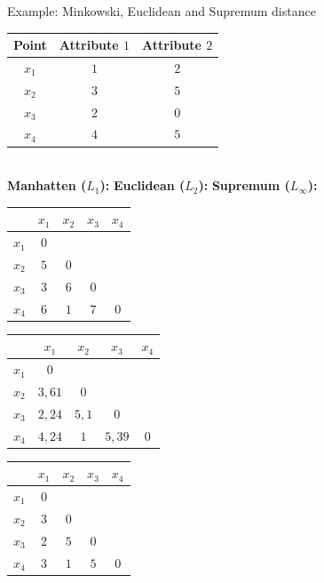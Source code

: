 \documentclass[aspectratio=169,t]{beamer}
\begin{document}
  { 
    \begin{frame}{Example: Minkowski, Euclidean and Supremum distance}
    \centering
        \begin{tabular}{| c | c | c |}
        \hline
        Point & Attribute $1$ & Attribute $2$\\\hline
        $x_1$ & $1$ & $2$\\\hline
        $x_2$ & $3$ & $5$\\\hline
        $x_3$ & $2$ & $0$\\\hline
        $x_4$ & $4$ & $5$\\\hline
        \end{tabular}\\[1cm]
      \textbf{Manhatten ($L_1$):} \hspace{2cm} \textbf{Euclidean ($L_2$):} \hspace{2cm} \textbf{Supremum ($L_\infty$):}\\
        \begin{tabular}{| c | c | c | c | c |}
        \hline
         & $x_1$ & $x_2$ & $x_3$ & $x_4$\\\hline
        $x_1$ & $0$ & & & \\\hline
        $x_2$ & $5$ & $0$ & & \\\hline
        $x_3$ & $3$ & $6$ & $0$ & \\\hline
        $x_4$ & $6$ & $1$ & $7$ & $0$ \\\hline
        \end{tabular}\hspace{0.1cm}
        \begin{tabular}{| c | c | c | c | c |}
        \hline
         & $x_1$ & $x_2$ & $x_3$ & $x_4$\\\hline
        $x_1$ & $0$ & & & \\\hline
        $x_2$ & $3,61$ & $0$ & & \\\hline
        $x_3$ & $2,24$ & $5,1$ & $0$ & \\\hline
        $x_4$ & $4,24$ & $1$ & $5,39$ & $0$ \\\hline
        \end{tabular}\hspace{0.1cm}
        \begin{tabular}{| c | c | c | c | c |}
        \hline
         & $x_1$ & $x_2$ & $x_3$ & $x_4$\\\hline
        $x_1$ & $0$ & & & \\\hline
        $x_2$ & $3$ & $0$ & & \\\hline
        $x_3$ & $2$ & $5$ & $0$ & \\\hline
        $x_4$ & $3$ & $1$ & $5$ & $0$ \\\hline
        \end{tabular}
    \end{frame}
  }
\end{document}
